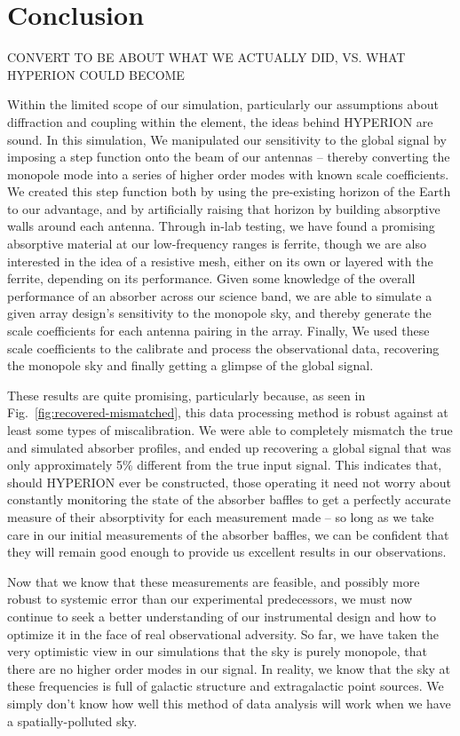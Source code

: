 \chapter{Conclusion}

CONVERT TO BE ABOUT WHAT WE ACTUALLY DID, VS. WHAT HYPERION COULD BECOME

Within the limited scope of our simulation, particularly our assumptions about 
diffraction and coupling within the element, the ideas behind HYPERION are 
sound.  In this simulation, We manipulated our sensitivity to the global signal 
by imposing a step function onto the beam of our antennas -- thereby converting 
the monopole mode into a series of higher order modes with known scale 
coefficients. We created this step function both by using the pre-existing 
horizon of the Earth to our advantage, and by artificially raising that horizon 
by building absorptive walls around each antenna. Through in-lab testing, we 
have found a promising absorptive material at our low-frequency ranges is 
ferrite, though we are also interested in the idea of a resistive mesh, either 
on its own or layered with the ferrite, depending on its performance. Given 
some knowledge of the  overall performance of an absorber across our science 
band, we are able to simulate a given array design's sensitivity to the 
monopole sky, and thereby generate the scale coefficients for each antenna 
pairing in the array.  Finally, We used these scale coefficients to the 
calibrate and process the observational data, recovering the monopole sky and 
finally getting a glimpse of the global signal.

These results are quite promising, particularly because, as seen in 
Fig.~\ref{fig:recovered-mismatched}, this data processing method is robust 
against at least some types of miscalibration. We were able to completely 
mismatch the true and simulated absorber profiles, and ended up recovering a 
global signal that was only approximately 5\% different from the true input 
signal. This indicates that, should HYPERION ever be constructed, those 
operating it need not worry about constantly monitoring the state of the 
absorber baffles to get a perfectly accurate measure of their absorptivity for 
each measurement made -- so long as we take care in our initial measurements of 
the absorber baffles, we can be confident that they will remain good enough to 
provide us excellent results in our observations.

Now that we know that these measurements are feasible, and possibly more robust 
to systemic error than our experimental predecessors, we must now continue to 
seek a better understanding of our instrumental design and how to optimize it 
in the face of real observational adversity. So far, we have taken the very 
optimistic view in our simulations that the sky is purely monopole, that there 
are no higher order modes in our signal. In reality, we know that the sky at 
these frequencies is full of galactic structure and extragalactic point 
sources. We simply don't know how well this method of data analysis will work 
when we have a spatially-polluted sky.

